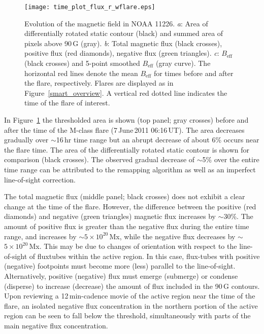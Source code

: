 {%

\begin{figure}[!t]
\centerline{\texttt{[image: time\_plot\_flux\_r\_wflare.eps]}}
\caption[Short-term evolution of NOAA 11226]{Evolution of the magnetic field in NOAA 11226. \emph{a}: Area of differentially rotated static contour (black) and summed area of pixels above 90\,G (gray). \emph{b}: Total magnetic flux (black crosses), positive flux (red diamonds), negative flux (green triangles). \emph{c}: $B_{\mathrm{eff}}$ (black crosses) and 5-point smoothed $B_{\mathrm{eff}}$ (gray curve). The horizontal red lines denote the mean $B_{\mathrm{eff}}$ for times before and after the flare, respectively. Flares are displayed as in Figure~\ref{smart_overview}. A vertical red dotted line indicates the time of the flare of interest.}
\label{smartprepostflare}
\end{figure}


In Figure~\ref{smartprepostflare} the thresholded area is shown (top panel; gray crosses) before and after the time of the M-class flare (7\,June\,2011 06:16\,UT). The area decreases gradually over $\sim$16\,hr time range but an abrupt decrease of about 6\% occurs near the flare time. The area of the differentially rotated static contour is shown for comparison (black crosses). The observed gradual decrease of $\sim$5\% over the entire time range can be attributed to the remapping algorithm as well as an imperfect line-of-sight correction.

The total magnetic flux (middle panel; black crosses) does not exhibit a clear change at the time of the flare. However, the difference between the positive (red diamonds) and negative (green triangles) magnetic flux increases by $\sim$30\%. The amount of positive flux is greater than the negative flux during the entire time range, and increases by $\sim$$5\times10^{20}$\,Mx, while the negative flux decreases by $\sim$$5\times10^{20}$\,Mx. This may be due to changes of orientation with respect to the line-of-sight of fluxtubes within the active region. In this case, flux-tubes with positive (negative) footpoints must become more (less) parallel to the line-of-sight. Alternatively, positive (negative) flux must emerge (submerge) or condense (disperse) to increase (decrease) the amount of flux included in the 90\,G contours. Upon reviewing a 12\,min-cadence movie of the active region near the time of the flare,
an isolated negative flux concentration in the northern portion of the active region can be seen to fall below the threshold, simultaneously with parts of the main negative flux concentration.

}
